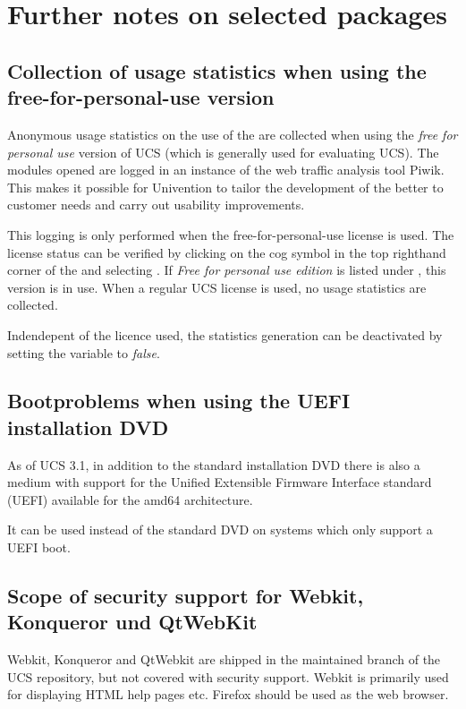 \chapter{Further notes on selected packages}

\section{Collection of usage statistics when using the free-for-personal-use version}

Anonymous usage statistics on the use of the \ucsUMC{} are collected when using the \emph{free for
personal use} version of UCS (which is generally used for evaluating UCS). The modules
opened are logged in an instance of the web traffic analysis tool Piwik. This makes it
possible for Univention to tailor the development of the \ucsUMC{} better to customer needs
and carry out usability improvements.

This logging is only performed when the free-for-personal-use license
is used. The license status can be verified by clicking on the cog
symbol in the top righthand corner of the \ucsUMC{} and
selecting . If \emph{Free for personal use
edition} is listed under , this version is in
use. When a regular UCS license is used, no usage statistics are
collected.

Indendepent of the licence used, the statistics generation can be
deactivated by setting the \ucsUCR{} variable  to \emph{false}.

\section{Bootproblems when using the UEFI installation DVD}
As of UCS 3.1, in addition to the standard installation DVD there is
also a medium with support for the Unified Extensible Firmware
Interface standard (UEFI) available for the amd64 architecture.

It can be used instead of the standard DVD on systems which only
support a UEFI boot.

\section{Scope of security support for Webkit, Konqueror und QtWebKit}
Webkit, Konqueror and QtWebkit are shipped in the maintained branch of
the UCS repository, but not covered with security support. Webkit is
primarily used for displaying HTML help pages etc. Firefox should be
used as the web browser.

